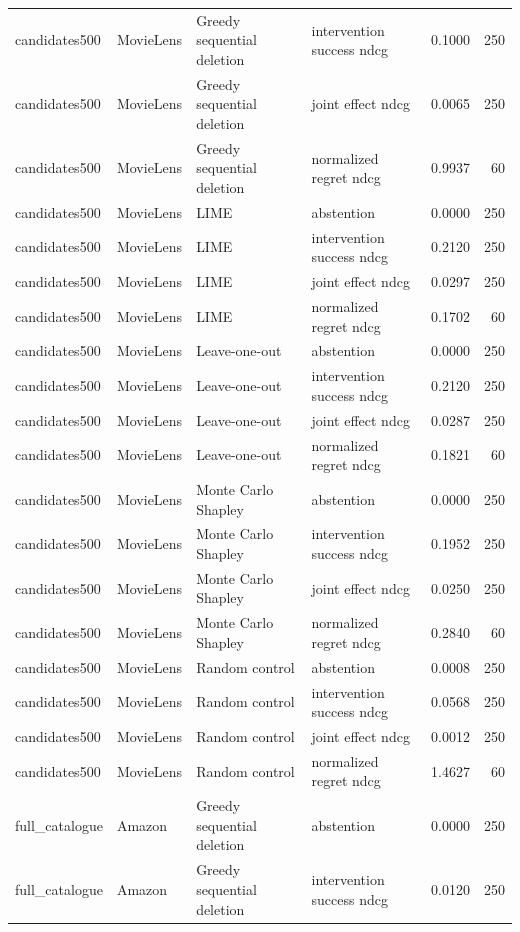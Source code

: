 \begin{longtable}{@{}p{}p{}p{}p{}rr@{}}
candidates500 & MovieLens & Greedy sequential deletion & intervention success ndcg & 0.1000 & 250 \\
candidates500 & MovieLens & Greedy sequential deletion & joint effect ndcg & 0.0065 & 250 \\
candidates500 & MovieLens & Greedy sequential deletion & normalized regret ndcg & 0.9937 & 60 \\
candidates500 & MovieLens & LIME & abstention & 0.0000 & 250 \\
candidates500 & MovieLens & LIME & intervention success ndcg & 0.2120 & 250 \\
candidates500 & MovieLens & LIME & joint effect ndcg & 0.0297 & 250 \\
candidates500 & MovieLens & LIME & normalized regret ndcg & 0.1702 & 60 \\
candidates500 & MovieLens & Leave-one-out & abstention & 0.0000 & 250 \\
candidates500 & MovieLens & Leave-one-out & intervention success ndcg & 0.2120 & 250 \\
candidates500 & MovieLens & Leave-one-out & joint effect ndcg & 0.0287 & 250 \\
candidates500 & MovieLens & Leave-one-out & normalized regret ndcg & 0.1821 & 60 \\
candidates500 & MovieLens & Monte Carlo Shapley & abstention & 0.0000 & 250 \\
candidates500 & MovieLens & Monte Carlo Shapley & intervention success ndcg & 0.1952 & 250 \\
candidates500 & MovieLens & Monte Carlo Shapley & joint effect ndcg & 0.0250 & 250 \\
candidates500 & MovieLens & Monte Carlo Shapley & normalized regret ndcg & 0.2840 & 60 \\
candidates500 & MovieLens & Random control & abstention & 0.0008 & 250 \\
candidates500 & MovieLens & Random control & intervention success ndcg & 0.0568 & 250 \\
candidates500 & MovieLens & Random control & joint effect ndcg & 0.0012 & 250 \\
candidates500 & MovieLens & Random control & normalized regret ndcg & 1.4627 & 60 \\
full\_catalogue & Amazon & Greedy sequential deletion & abstention & 0.0000 & 250 \\
full\_catalogue & Amazon & Greedy sequential deletion & intervention success ndcg & 0.0120 & 250 \\

\end{longtable}
